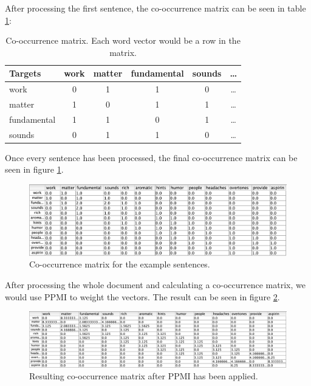 After processing the first sentence, the co-occurrence matrix can be seen in table \ref{exampleCoocmat}:

\begin{table}[h]
    \centering
    \begin{tabular}{|l|c|c|c|c|c|}
    \hline
    Targets & work & matter & fundamental & sounds & \dots \\
    \hline
    work & 0 & 1 & 1 & 0 & \dots \\
    \hline
    matter & 1 & 0 & 1 & 1 & \dots \\
    \hline
    fundamental & 1 & 1 & 0 & 1 & \dots \\
    \hline
    sounds & 0 & 1 & 1 & 0 & \dots \\
    \hline
    \end{tabular}
    \caption{Co-occurrence matrix. Each word vector would be a row in the matrix.}
    \label{exampleCoocmat}
\end{table}

Once every sentence has been processed, the final co-occurrence matrix can be seen in figure \ref{coocExample}.

\begin{figure}[h]
    \centering
    \includegraphics[scale=.5]{./images/full_cooc_matrix.png}
    \caption[Generated using SimBrain.]{Co-occurrence matrix for the example sentences.}
 \label{coocExample}
\end{figure}

After processing the whole document and calculating a co-occurrence matrix, we would use PPMI to weight the vectors. The result can be seen in figure \ref{ppmiExample}.

\begin{figure}[h]
    \centering
    \includegraphics[scale=.45]{./images/weighted_cooc_matrix.png}
    \caption[Generated using SimBrain.]{Resulting co-occurrence matrix after PPMI has been applied.}
 \label{ppmiExample}
\end{figure}

